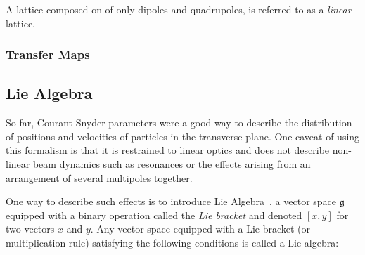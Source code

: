 A lattice composed on of only dipoles and quadrupoles, is referred to as a \textit{linear} lattice.


\subsubsection{Transfer Maps}




\subsection{Lie Algebra}

So far, Courant-Snyder parameters were a good way to describe the distribution of positions and
velocities of particles in the transverse plane. One caveat of using this formalism is that it is 
restrained to linear optics and does not describe non-linear beam dynamics such as resonances or 
the effects arising from an arrangement of several multipoles together.

One way to describe such effects is to introduce Lie Algebra~\cite{dragt_overview_2013}, a vector
space $\mathfrak{g}$ equipped with a binary operation called the \textit{Lie bracket} and denoted
$[x, y]$ for two vectors $x$ and $y$. Any vector space equipped with a Lie bracket (or
multiplication rule) satisfying the following conditions is called a Lie algebra:

